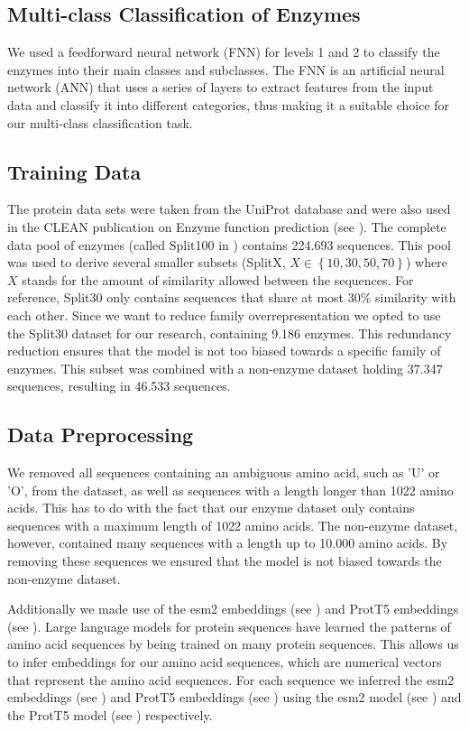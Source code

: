 \documentclass{bioinfo}
\begin{document}
\begin{methods}
\subsection{Multi-class Classification of Enzymes}
We used a feedforward neural network (FNN) for levels 1 and 2 to classify the enzymes into their main classes and subclasses.
The FNN is an artificial neural network (ANN) that uses a series of layers to extract features from the input data and classify it into different categories,
thus making it a suitable choice for our multi-class classification task. 

\subsection{Training Data}

The protein data sets were taken from the UniProt database and were also used in the CLEAN publication on Enzyme function prediction (see \cite{CleanArticle}). 
The complete data pool of enzymes (called Split100 in \cite{CleanArticle}) contains 224.693 sequences. 
This pool was used to derive several smaller subsets (SplitX, $X \in \left\{10, 30, 50, 70\right\}$) where $X$ stands for the amount of similarity allowed between the sequences.
For reference, Split30 only contains sequences that share at most 30\% similarity with each other.
Since we want to reduce family overrepresentation we opted to use the Split30 dataset for our research,
containing 9.186 enzymes.
This redundancy reduction ensures that the model is not too biased towards a specific family of enzymes.
This subset was combined with a non-enzyme dataset holding 37.347 sequences, resulting in 46.533 sequences.

\subsection{Data Preprocessing}

We removed all sequences containing an ambiguous amino acid, such as 'U' or 'O', from the dataset, as well as
sequences with a length longer than 1022 amino acids. 
This has to do with the fact that our enzyme dataset only contains sequences with a maximum length of 1022 amino acids.
The non-enzyme dataset, however, contained many sequences with a length up to 10.000 amino acids.
By removing these sequences we ensured that the model is not biased towards the non-enzyme dataset.


Additionally we made use of the esm2 embeddings (see \cite{ESM2}) and ProtT5 embeddings (see \cite{ProtT5}).
Large language models for protein sequences  have learned the patterns of amino acid sequences by being trained on many protein sequences.
This allows us to infer embeddings for our amino acid sequences, which are numerical vectors that represent the amino acid sequences.
For each sequence we inferred the esm2 embeddings (see \cite{ESM2}) and ProtT5 embeddings (see \cite{ProtT5}) 
using the esm2 model (see \cite{ESM2}) and the ProtT5 model (see \cite{ProtT5}) respectively.


\end{methods}
\end{document}
